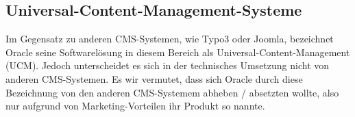 \subsection{Universal-Content-Management-Systeme}
Im Gegensatz zu anderen CMS-Systemen, wie Typo3 oder Joomla, bezeichnet Oracle seine Softwarelösung in diesem Bereich als Universal-Content-Management (\gls{UCM}).
Jedoch unterscheidet es sich in der technisches Umsetzung nicht von anderen CMS-Systemen.
Es wir vermutet, dass sich Oracle durch diese Bezeichnung von den anderen CMS-Systemem abheben / absetzten wollte, also nur aufgrund von Marketing-Vorteilen ihr Produkt so nannte.




















